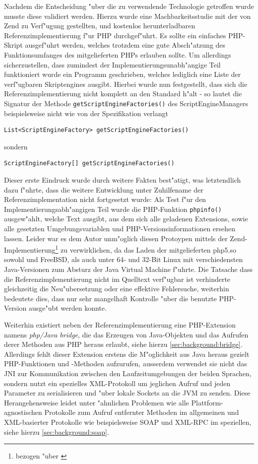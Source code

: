 Nachdem die Entscheidung "uber die zu verwendende Technologie getroffen wurde musste diese validiert werden. Hierzu wurde
eine Machbarkeitsstudie mit der von Zend zu Verf"ugung gestellten, und kostenlos herunterladbaren Referenzimplementierung
f"ur PHP durchgef"uhrt. Es sollte ein einfaches PHP-Skript ausgef"uhrt werden, welches trotzdem eine gute Absch"atzung
des Funktionsumfanges des mitgelieferten PHPs erlauben sollte. Um allerdings sicherzustellen, dass zumindest der 
Implementierungsunabh"angige Teil funktioniert wurde ein Programm geschrieben, welches lediglich eine Liste der verf"ugbaren
Skriptengines ausgibt. Hierbei wurde nun festgestellt, dass sich die Referenzimplementierung nicht komplett an den Standard
h"alt - so lautet die Signatur der Methode \texttt{getScriptEngineFactories()} des ScriptEngineManagers beispielsweise 
nicht wie von der Spezifikation verlangt
\begin{lstlisting}[name=Vom Standard verlangte Signatur]
    List<ScriptEngineFactory> getScriptEngineFactories()
\end{lstlisting}
sondern
\begin{lstlisting}[name=Signatur in der Referenzimplementierung]
    ScriptEngineFactory[] getScriptEngineFactories()
\end{lstlisting}
Dieser erste Eindruck wurde durch weitere Fakten best"atigt, was letztendlich dazu f"uhrte, dass die weitere Entwicklung 
unter Zuhilfename der Referenzimplementation nicht fortgesetzt wurde:
Als Test f"ur den Implementierungsabh"angigen Teil wurde die PHP-Funktion \texttt{phpinfo()} ausgew"ahlt, welche
Text ausgibt, aus dem sich alle geladenen Extensions, sowie alle gesetzten Umgebungsvariablen und 
PHP-Versionsinformationen ersehen lassen. Leider war es dem Autor unm"oglich diesen Protoypen mittels der Zend-Implementierung\footnote{
bezogen "uber \cite{JSRDL}}
zu verwirklichen, da das Laden der mitgelieferten php5.so sowohl und FreeBSD, als auch unter 64- und 32-Bit Linux mit 
verschiedensten Java-Versionen zum Absturz der Java Virtual Machine f"uhrte. Die Tatsache dass die Referenzimplementierung nicht
im Quelltext verf"ugbar ist verhinderte gleichzeitig die Neu"ubersetzung oder eine effektive Fehlersuche, weiterhin bedeutete
dies, dass nur sehr mangelhaft Kontrolle "uber die benutzte PHP-Version ausge"ubt werden konnte.

Weiterhin existiert neben der Referenzimplementierung eine PHP-Extension namens \emph{php/Java bridge}, die das Erzeugen von 
Java-Objekten und das Aufrufen derer Methoden aus PHP heraus erlaubt, siehe hierzu \ref{sec:background:bridge}. 
Allerdings fehlt dieser Extension erstens die M"oglichkeit aus Java heraus gezielt PHP-Funktionen und -Methoden aufzurufen, 
ausserdem verwendet sie nicht das JNI zur Kommunikation zwischen den Laufzeitumgebungen der beiden Sprachen, sondern nutzt ein spezielles XML-Protokoll
um jeglichen Aufruf und jeden Parameter zu serialisieren und "uber lokale Sockets an die JVM zu senden. 
Diese Herangehensweise leidet unter "ahnlichen Problemen wie alle Plattform-agnostischen Protokolle zum Aufruf entfernter Methoden 
im allgemeinen und XML-basierter Protokolle wie beispielsweise SOAP und XML-RPC im speziellen, siehe hierzu
\ref{sec:background:soap}.

